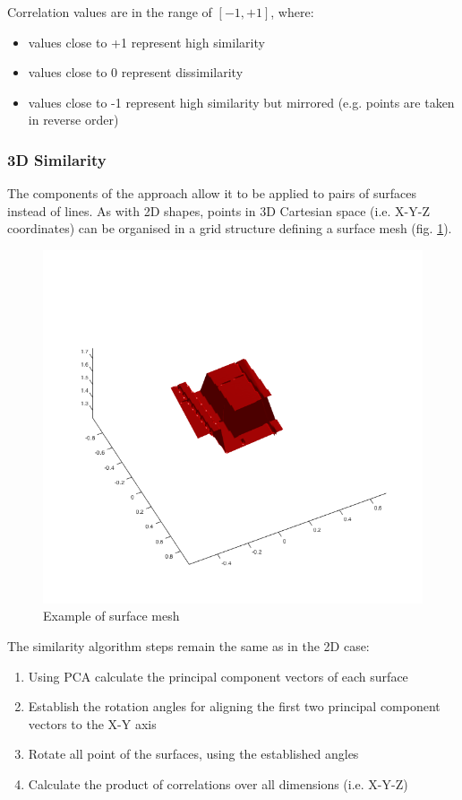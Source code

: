 \documentclass[11]{article}
\begin{document}
Correlation values are in the range of $[-1,+1]$, where:
\begin{itemize}
    \item values close to +1 represent high similarity
    \item values close to 0 represent dissimilarity 
    \item values close to -1 represent high similarity but mirrored (e.g. points are taken in reverse order) 
\end{itemize}

\pagebreak[2]
\subsubsection{3D Similarity}

The components of the approach allow it to be applied to pairs of surfaces instead of lines. 
As with 2D shapes, points in 3D Cartesian space (i.e. X-Y-Z coordinates) can be organised in a grid structure defining a surface mesh (fig. \ref{fig:mesh_example}).

\begin{figure}[h]
  \centering
  \includegraphics[width=.5\textwidth]{figures/mesh_example.png}
  \caption{Example of surface mesh}
  \label{fig:mesh_example}
\end{figure}  

The similarity algorithm steps remain the same as in the 2D case: 
\begin{enumerate}
    \item Using PCA calculate the principal component vectors of each surface 
    \item Establish the rotation angles for aligning the first two principal component vectors to the X-Y axis 
    \item Rotate all point of the surfaces, using the established angles
    \item Calculate the product of correlations over all dimensions (i.e. X-Y-Z) 
\end{enumerate}
\end{document}
